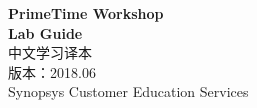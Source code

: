 \documentclass[UTF8,a4paper,openany,oneside]{ctexbook}
\begin{document}
\begin{titlepage}
  \centering
  \vspace*{2cm}
  {\Huge\bfseries PrimeTime Workshop}\\[0.6em]
  {\Huge\bfseries Lab Guide}\\[1.2em]
  {\LARGE 中文学习译本}\\[2em]
  {\large 版本：2018.06}\\[0.5em]
  {\large Synopsys Customer Education Services}\\[3em]
  \begin{minipage}{0.85\textwidth}
    \copyrightnotice
  \end{minipage}
  \vfill
\end{titlepage}

\frontmatter
\tableofcontents
\clearpage


\mainmatter





\setcounter{chapter}{6}




\appendix

\end{document}
